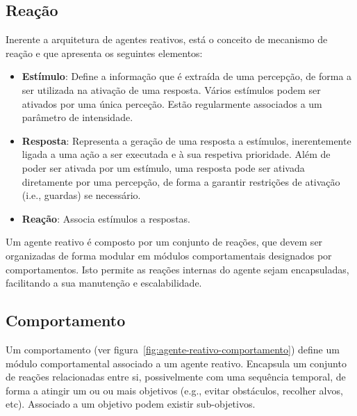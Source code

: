\subsection{Reação}\label{subsec:reacao}

Inerente a arquitetura de agentes reativos, está o conceito de mecanismo de reação e que apresenta os seguintes elementos:

\begin{itemize}
    \item \textbf{Estímulo}: Define a informação que é extraída de uma percepção, de forma a ser utilizada na ativação de uma resposta.
    Vários estímulos podem ser ativados por uma única perceção.
    Estão regularmente associados a um parâmetro de intensidade.
    \item \textbf{Resposta}: Representa a geração de uma resposta a estímulos, inerentemente ligada a uma ação a ser executada e à sua respetiva prioridade.
    Além de poder ser ativada por um estímulo, uma resposta pode ser ativada diretamente por uma percepção, de forma a garantir restrições de ativação (i.e., guardas) se necessário.
    \item \textbf{Reação}: Associa estímulos a respostas.
\end{itemize}

Um agente reativo é composto por um conjunto de reações, que devem ser organizadas de forma modular em módulos comportamentais designados por comportamentos.
Isto permite as reações internas do agente sejam encapsuladas, facilitando a sua manutenção e escalabilidade.

\subsection{Comportamento}\label{subsec:comportamento}

Um comportamento (ver figura~\ref{fig:agente-reativo-comportamento}) define um módulo comportamental associado a um agente reativo. Encapsula um conjunto de reações relacionadas entre si, possivelmente com uma sequência temporal, de forma a atingir um ou ou mais objetivos (e.g., evitar obstáculos, recolher alvos, etc). Associado a um objetivo podem existir sub-objetivos.

